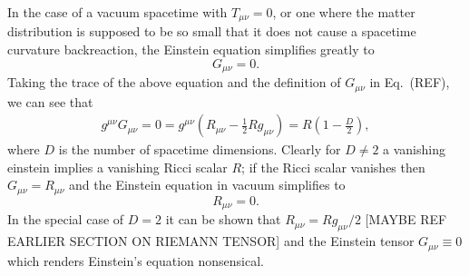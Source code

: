 In the case of a vacuum spacetime with $T_{\mu\nu}=0$, or one where the matter distribution is supposed to be so small that it does not cause a spacetime curvature backreaction, the Einstein equation simplifies greatly to
\begin{equation}G_{\mu\nu}=0.\end{equation}
Taking the trace of the above equation and the definition of $G_{\mu\nu}$ in Eq.~(REF), we can see that 
\begin{align}
g^{\mu\nu}G_{\mu\nu}=0=g^{\mu\nu}(R_{\mu\nu}-\frac{1}{2}Rg_{\mu\nu}) = R(1-\frac{D}{2}),
\end{align}
where $D$ is the number of spacetime dimensions. Clearly for $D\neq 2$ a vanishing einstein implies a vanishing Ricci scalar $R$; if the Ricci scalar vanishes then $G_{\mu\nu}=R_{\mu\nu}$ and the Einstein equation in vacuum simplifies to 
\begin{equation}
R_{\mu\nu} = 0.
\end{equation}
In the special case of $D=2$ it can be shown that $R_{\mu\nu} = Rg_{\mu\nu}/2$ [MAYBE REF EARLIER SECTION ON RIEMANN TENSOR] and the Einstein tensor $G_{\mu\nu}\equiv 0$ which renders Einstein's equation nonsensical.




